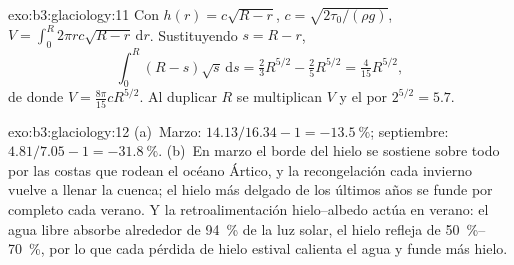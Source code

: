 \begin{solution}{exo:b3:glaciology:11}
Con $h(r) = c\sqrt{R - r}$, $c = \sqrt{2\tau_0/(\rho g)}$, $V =
\int_0^R2\pi rc\sqrt{R - r}\,\mathrm dr$. Sustituyendo $s = R - r$,
\[
\int_0^R(R - s)\sqrt s\,\mathrm ds = \tfrac23R^{5/2} - \tfrac25R^{5/2} =
\tfrac4{15}R^{5/2},
\]
de donde $V = \frac{8\pi}{15}cR^{5/2}$. Al duplicar $R$
se multiplican $V$ y el  por $2^{5/2} = 5.7$.
\end{solution}

\begin{solution}{exo:b3:glaciology:12}
(a)~Marzo: $14.13/16.34 - 1 = \qty{-13.5}{\percent}$; septiembre: $4.81/7.05
- 1 = \qty{-31.8}{\percent}$. (b)~En marzo el borde del hielo se sostiene sobre todo por
las costas que rodean el océano Ártico, y la recongelación cada invierno
vuelve a llenar la cuenca; el hielo más delgado de los últimos años se funde
por completo cada verano. Y la retroalimentación hielo--albedo actúa en verano: el agua libre
absorbe alrededor de \qty{94}{\percent} de la luz solar, el hielo refleja de
\qtyrange{50}{70}{\percent}, por lo que cada pérdida de hielo estival calienta el agua y
funde más hielo.
\end{solution}

